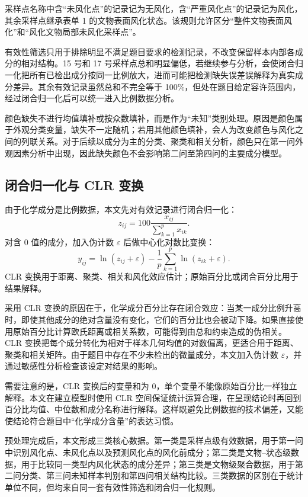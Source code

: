 \documentclass[UTF8,zihao=-4,a4paper,fontset=fandol]{ctexart}
\begin{document}
采样点名称中含“未风化点”的记录记为无风化，含“严重风化点”的记录记为风化，其余采样点继承表单 1 的文物表面风化状态。该规则允许区分“整件文物表面风化”和“风化文物局部未风化采样点”。

有效性筛选只用于排除明显不满足题目要求的检测记录，不改变保留样本内部各成分的相对结构。15 号和 17 号采样点总和明显偏低，若继续参与分析，会使闭合归一化把所有已检出成分按同一比例放大，进而可能把检测缺失误差误解释为真实成分差异。其余有效记录虽然总和不完全等于 100\%，但处在题目给定容许范围内，经过闭合归一化后可以统一进入比例数据分析。

颜色缺失不进行均值填补或按众数填补，而是作为“未知”类别处理。原因是颜色属于外观分类变量，缺失不一定随机；若用其他颜色填补，会人为改变颜色与风化之间的列联关系。对于后续以成分为主的分类、聚类和相关分析，颜色只在第一问外观因素分析中出现，因此缺失颜色不会影响第二问至第四问的主要成分模型。

\subsection{闭合归一化与 CLR 变换}

由于化学成分是比例数据，本文先对有效记录进行闭合归一化：
\begin{equation}
  z_{ij}=100\frac{x_{ij}}{\sum_{k=1}^{p}x_{ik}}.
  \label{eq:closure}
\end{equation}
对含 0 值的成分，加入伪计数 $\varepsilon$ 后做中心化对数比变换：
\begin{equation}
  y_{ij}=\ln(z_{ij}+\varepsilon)-\frac{1}{p}\sum_{k=1}^{p}\ln(z_{ik}+\varepsilon).
  \label{eq:clr}
\end{equation}
CLR 变换用于距离、聚类、相关和风化效应估计；原始百分比或闭合百分比用于结果解释。

采用 CLR 变换的原因在于，化学成分百分比存在闭合效应：当某一成分比例升高时，即使其他成分的绝对含量没有变化，它们的百分比也会被动下降。如果直接使用原始百分比计算欧氏距离或相关系数，可能得到由总和约束造成的伪相关。CLR 变换把每个成分转化为相对于样本几何均值的对数偏离，更适合用于距离、聚类和相关矩阵。由于题目中存在不少未检出的微量成分，本文加入伪计数 $\varepsilon$，并通过敏感性分析检查该设定对结果的影响。

需要注意的是，CLR 变换后的变量和为 0，单个变量不能像原始百分比一样独立解释。本文在建立模型时使用 CLR 空间保证统计运算合理，在呈现结论时再回到百分比均值、中位数和成分名称进行解释。这样既避免比例数据的技术偏差，又能使结论符合题目中“化学成分含量”的表达习惯。

预处理完成后，本文形成三类核心数据。第一类是采样点级有效数据，用于第一问中识别风化点、未风化点以及预测风化点的风化前成分；第二类是文物--状态级数据，用于比较同一类型内风化状态的成分差异；第三类是文物级聚合数据，用于第二问分类、第三问未知样本判别和第四问相关结构比较。三类数据的区别在于统计单位不同，但均来自同一套有效性筛选和闭合归一化规则。
\end{document}

